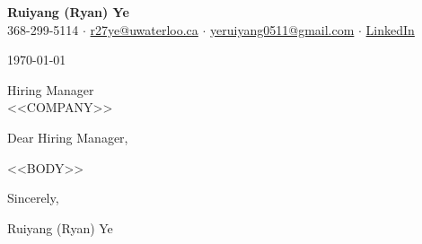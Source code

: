 \documentclass[letterpaper,11pt]{article}
\begin{document}
\begin{center}
  {\large\textbf{Ruiyang (Ryan) Ye}}\\[3pt]
  368-299-5114 \(\cdot\)
  \href{mailto:r27ye@uwaterloo.ca}{r27ye@uwaterloo.ca} \(\cdot\)
  \href{mailto:yeruiyang0511@gmail.com}{yeruiyang0511@gmail.com} \(\cdot\)
  \href{https://www.linkedin.com/in/ruiyang-ye-992b66298/}{LinkedIn}
\end{center}

\vspace{0.8em}

\noindent\today

\vspace{0.8em}

\noindent
Hiring Manager\\
<<COMPANY>>

\vspace{0.8em}

\noindent Dear Hiring Manager,

<<BODY>>

\vspace{1.2em}

\noindent Sincerely,

\vspace{2.5em}

\noindent Ruiyang (Ryan) Ye
\end{document}
